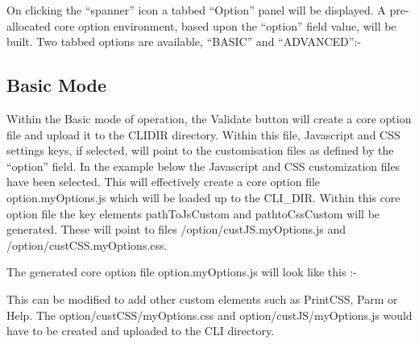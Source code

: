 \documentclass[letterpaper,10pt,english]{sphinxmanual}
\begin{document}

On clicking the “spanner” icon a tabbed “Option” panel will be displayed. A pre-allocated core option environment, based upon the “option” field value, will be built. Two tabbed options are available, “BASIC” and “ADVANCED”:-



\subsection{Basic Mode}
\label{\detokenize{TN202002:basic-mode}}
Within the Basic mode of operation, the Validate button will create a core option file and upload it to the CLIDIR directory. Within this file, Javascript and CSS settings keys, if selected, will point to the customisation files as defined by the “option” field. In the example below the Javascript and CSS customization files have been selected. This will effectively create a core option file option.myOptions.js which will be loaded up to the CLI\_DIR. Within this core option file the key elements pathToJsCustom and pathtoCssCustom will be generated. These will point to files /option/custJS.myOptions.js and /option/custCSS.myOptions.css.


The generated core option file option.myOptions.js will look like this :-

\begin{sphinxVerbatim}[commandchars=\\\{\}]
   
 
\end{sphinxVerbatim}

This can be modified to add other custom elements such as PrintCSS, Parm or Help. The option/custCSS/myOptions.css and option/custJS/myOptions.js would have to be created and uploaded to the CLI directory.
\end{document}
